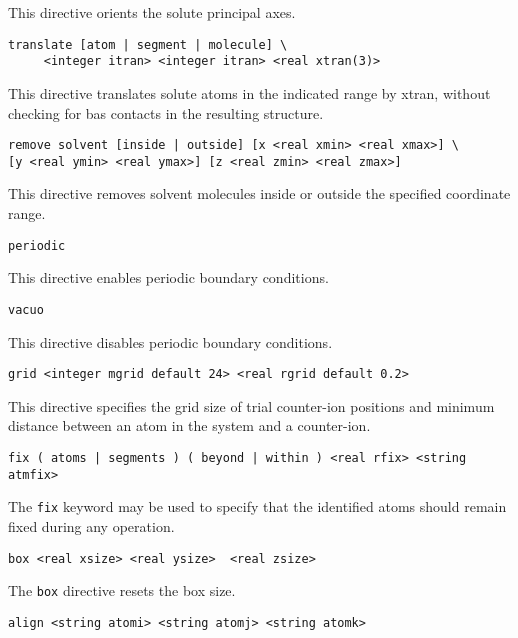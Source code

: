 This directive orients the solute principal axes.

\begin{verbatim}
translate [atom | segment | molecule] \
	 <integer itran> <integer itran> <real xtran(3)>
\end{verbatim}

This directive translates solute atoms in the indicated range by xtran,
without checking for bas contacts in the resulting structure.

\begin{verbatim}
remove solvent [inside | outside] [x <real xmin> <real xmax>] \
[y <real ymin> <real ymax>] [z <real zmin> <real zmax>]
\end{verbatim}

This directive removes solvent molecules inside or outside the
specified coordinate range.

\begin{verbatim}
periodic
\end{verbatim}

This directive enables periodic boundary conditions.

\begin{verbatim}
vacuo
\end{verbatim}

This directive disables periodic boundary conditions.

\begin{verbatim}
grid <integer mgrid default 24> <real rgrid default 0.2>
\end{verbatim}

This directive specifies the grid size of trial counter-ion positions and 
minimum distance between an atom in the system and a counter-ion. 

\begin{verbatim}
fix ( atoms | segments ) ( beyond | within ) <real rfix> <string atmfix>
\end{verbatim}

The \verb+fix+ keyword may be used to specify that the identified
atoms should remain fixed during any operation.

\begin{verbatim}
box <real xsize> <real ysize>  <real zsize>
\end{verbatim}

The \verb+box+ directive resets the box size.

\begin{verbatim}
align <string atomi> <string atomj> <string atomk>
\end{verbatim}

